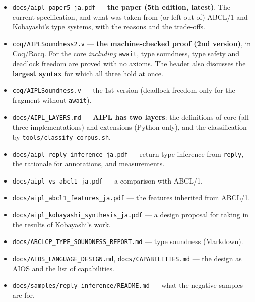 \documentclass[11pt,a4paper]{article}
\begin{document}
\begin{itemize}
\item \texttt{docs/aipl\_paper5\_ja.pdf} ---
  \textbf{the paper (5th edition, latest)}. The current specification, and what
  was taken from (or left out of) ABCL/1 and Kobayashi's type systems, with the
  reasons and the trade-offs.
\item \texttt{coq/AIPLSoundness2.v} ---
  \textbf{the machine-checked proof (2nd version)}, in Coq/Rocq. For the core
  \emph{including} \texttt{await}, type soundness, type safety and deadlock
  freedom are proved with no axioms. The header also discusses the
  \textbf{largest syntax} for which all three hold at once.
\item \texttt{coq/AIPLSoundness.v} --- the 1st version (deadlock freedom only
  for the fragment without \texttt{await}).
\item \texttt{docs/AIPL\_LAYERS.md} ---
  \textbf{AIPL has two layers}: the definitions of core (all three
  implementations) and extensions (Python only), and the classification by
  \texttt{tools/classify\_corpus.sh}.
\item \texttt{docs/aipl\_reply\_inference\_ja.pdf} --- return type inference
  from \texttt{reply}, the rationale for annotations, and measurements.
\item \texttt{docs/aipl\_vs\_abcl1\_ja.pdf} --- a comparison with ABCL/1.
\item \texttt{docs/aipl\_abcl1\_features\_ja.pdf} --- the features inherited
  from ABCL/1.
\item \texttt{docs/aipl\_kobayashi\_synthesis\_ja.pdf} --- a design proposal
  for taking in the results of Kobayashi's work.
\item \texttt{docs/ABCLCP\_TYPE\_SOUNDNESS\_REPORT.md} --- type soundness
  (Markdown).
\item \texttt{docs/AIOS\_LANGUAGE\_DESIGN.md}, \texttt{docs/CAPABILITIES.md} ---
  the design as AIOS and the list of capabilities.
\item \texttt{docs/samples/reply\_inference/README.md} --- what the negative
  samples are for.
\end{itemize}
\end{document}
